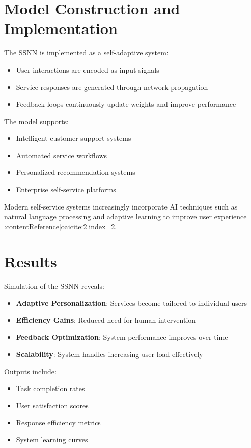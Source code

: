 \documentclass[12pt]{article}
\begin{document}
\section{Model Construction and Implementation}

The SSNN is implemented as a self-adaptive system:

\begin{itemize}
\item User interactions are encoded as input signals
\item Service responses are generated through network propagation
\item Feedback loops continuously update weights and improve performance
\end{itemize}

The model supports:

\begin{itemize}
\item Intelligent customer support systems
\item Automated service workflows
\item Personalized recommendation systems
\item Enterprise self-service platforms
\end{itemize}

Modern self-service systems increasingly incorporate AI techniques such as natural language processing and adaptive learning to improve user experience :contentReference[oaicite:2]{index=2}.

\section{Results}

Simulation of the SSNN reveals:

\begin{itemize}
\item \textbf{Adaptive Personalization}: Services become tailored to individual users
\item \textbf{Efficiency Gains}: Reduced need for human intervention
\item \textbf{Feedback Optimization}: System performance improves over time
\item \textbf{Scalability}: System handles increasing user load effectively
\end{itemize}

Outputs include:

\begin{itemize}
\item Task completion rates
\item User satisfaction scores
\item Response efficiency metrics
\item System learning curves
\end{itemize}
\end{document}
